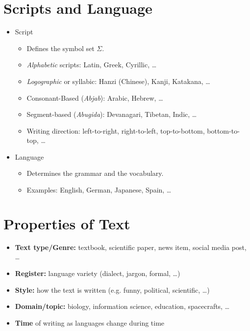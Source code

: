     \section{Scripts and Language} %
        \begin{itemize}
        	\item Script
        		\begin{itemize}
        			\item Defines the symbol set \( \Sigma \).
        			\item \textit{Alphabetic} scripts: Latin, Greek, Cyrillic, \dots
        			\item \textit{Logographic} or syllabic: Hanzi (Chinese), Kanji, Katakana, \dots
        			\item Consonant-Based (\textit{Abjab}): Arabic, Hebrew, \dots
        			\item Segment-based (\textit{Abugida}): Devanagari, Tibetan, Indic, \dots
        			\item Writing direction: left-to-right, right-to-left, top-to-bottom, bottom-to-top, \dots
        		\end{itemize}
        	\item Language
        		\begin{itemize}
        			\item Determines the grammar and the vocabulary.
        			\item Examples: English, German, Japanese, Spain, \dots
        		\end{itemize}
        \end{itemize}

    \section{Properties of Text} %
        \begin{itemize}
        	\item \textbf{Text type/Genre:} textbook, scientific paper, news item, social media post, \dots
        	\item \textbf{Register:} language variety (dialect, jargon, formal, \dots)
        	\item \textbf{Style:} how the text is written (e.g. funny, political, scientific, \dots)
        	\item \textbf{Domain/topic:} biology, information science, education, spacecrafts, \dots
        	\item \textbf{Time} of writing as languages change during time
        \end{itemize}

